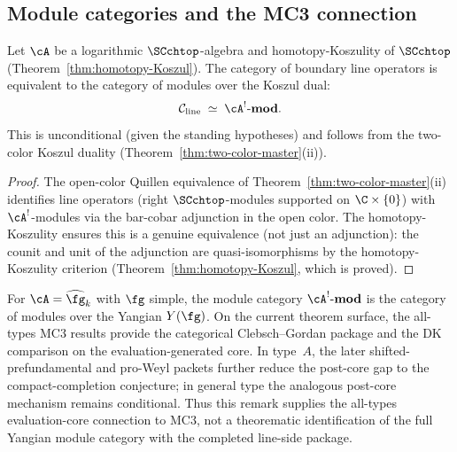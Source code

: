 \subsection{Module categories and the MC3 connection}

\begin{theorem}
Let\/ $\cA$ be a logarithmic\/ $\SCchtop$-algebra and homotopy-Koszulity of $\SCchtop$
\textup{(}Theorem~\textup{\ref{thm:homotopy-Koszul})}.
The category of boundary line operators is equivalent to the
category of modules over the Koszul dual:
\begin{equation}
\mathcal{C}_{\mathrm{line}} \;\simeq\; \cA^!\text{-}\mathbf{mod}.
\end{equation}
This is unconditional (given the standing hypotheses) and follows
from the two-color Koszul duality
\textup{(}Theorem~\textup{\ref{thm:two-color-master}(ii))}.
\end{theorem}

\begin{proof}
The open-color Quillen equivalence of
Theorem~\ref{thm:two-color-master}(ii) identifies line operators
(right $\SCchtop$-modules supported on $\C \times \{0\}$) with
$\cA^!$-modules via the bar-cobar adjunction in the open color.
The homotopy-Koszulity ensures this is a genuine equivalence (not
just an adjunction): the counit and unit of the adjunction are
quasi-isomorphisms by the homotopy-Koszulity criterion
(Theorem~\ref{thm:homotopy-Koszul}, which is proved).
\end{proof}

\begin{remark}
For $\cA = \widehat{\fg}_k$ with $\fg$ simple, the module category
$\cA^!\text{-}\mathbf{mod}$ is the category of modules over the
Yangian $Y(\fg)$. On the current theorem surface, the all-types MC3
results provide the categorical Clebsch--Gordan package and the DK
comparison on the evaluation-generated core. In type~$A$, the later
shifted-prefundamental and pro-Weyl packets further reduce the
post-core gap to the compact-completion conjecture; in general type
the analogous post-core mechanism remains conditional. Thus this
remark supplies the all-types evaluation-core connection to MC3, not a
theorematic identification of the full Yangian module category with
the completed line-side package.
\end{remark}


